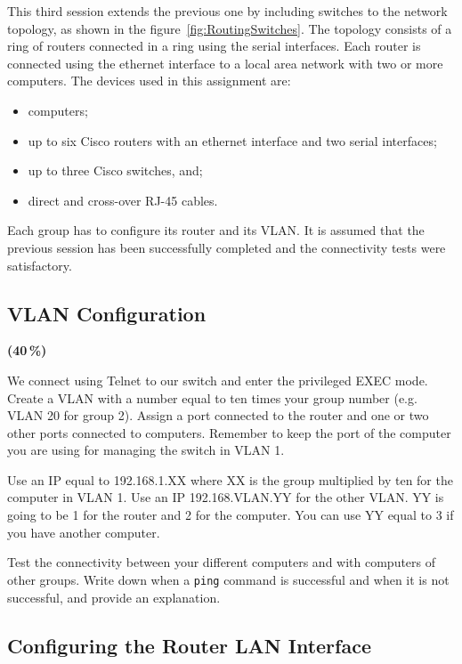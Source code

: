 This third session extends the previous one by including switches to the network topology, as shown in the figure~\ref{fig:RoutingSwitches}. The topology consists of a ring of routers connected in a ring using the serial interfaces. Each router is connected using the ethernet interface to a local area network with two or more computers. The devices used in this assignment are:

\begin{itemize}
\item computers;
\item up to six Cisco routers with an ethernet interface and two serial interfaces;
\item up to three Cisco switches, and;
\item direct and cross-over RJ-45 cables.
\end{itemize}

Each group has to configure its router and its VLAN. It is assumed that the previous session has been successfully completed and the connectivity tests were satisfactory.

\subsection{VLAN Configuration}

{\color{red}\textbf{(40\,\%)}}

We connect using Telnet to our switch and enter the privileged EXEC mode. Create a VLAN with a number equal to ten times your group number (e.g. VLAN 20 for group 2). Assign a port connected to the router and one or two other ports connected to computers. Remember to keep the port of the computer you are using for managing the switch in VLAN 1.

Use an IP equal to 192.168.1.XX where XX is the group multiplied by ten for the computer in VLAN 1. Use an IP 192.168.VLAN.YY for the other VLAN. YY is going to be 1 for the router and 2 for the computer. You can use YY equal to 3 if you have another computer.

Test the connectivity between your different computers and with computers of other groups. Write down when a \texttt{\color{blue}ping} command is successful and when it is not successful, and provide an explanation.

\subsection{Configuring the Router LAN Interface}

